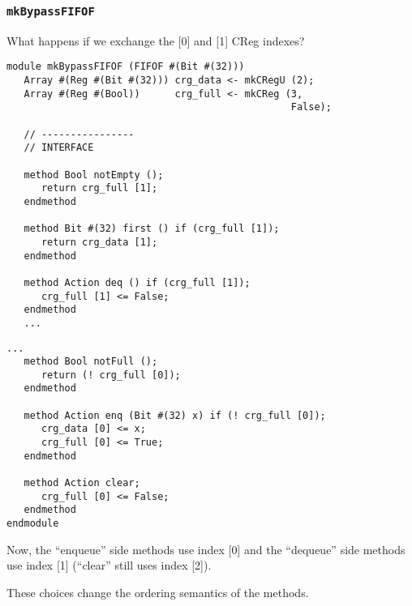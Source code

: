 \begin{frame}[fragile]
\frametitle{{\tt mkBypassFIFOF}}

\label{mkBypassFIFOF}

\footnotesize

What happens if we exchange the [0] and [1] CReg indexes?

\begin{center}
\begin{minipage}[t]{0.49\textwidth}\scriptsize
\begin{Verbatim}[frame=single]
module mkBypassFIFOF (FIFOF #(Bit #(32)))
   Array #(Reg #(Bit #(32))) crg_data <- mkCRegU (2);
   Array #(Reg #(Bool))      crg_full <- mkCReg (3,
                                                 False);

   // ----------------
   // INTERFACE

   method Bool notEmpty ();
      return crg_full [1];
   endmethod

   method Bit #(32) first () if (crg_full [1]);
      return crg_data [1];
   endmethod

   method Action deq () if (crg_full [1]);
      crg_full [1] <= False;
   endmethod
   ...
\end{Verbatim}
\end{minipage}
\hfill
\begin{minipage}[t]{0.48\textwidth}\scriptsize
\begin{Verbatim}[frame=single]
   ...
   method Bool notFull ();
      return (! crg_full [0]);
   endmethod

   method Action enq (Bit #(32) x) if (! crg_full [0]);
      crg_data [0] <= x;
      crg_full [0] <= True;
   endmethod

   method Action clear;
      crg_full [0] <= False;
   endmethod
endmodule
\end{Verbatim}

\vspace{1ex}

Now, the ``enqueue'' side methods use index [0] and the ``dequeue''
side methods use index [1] (``clear'' still uses index [2]).

\vspace{1ex}

These choices change the ordering semantics of the methods.

\end{minipage}
\end{center}

\end{frame}

